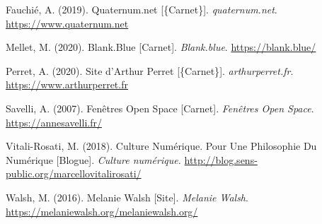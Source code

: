 \documentclass[12pt,french,letterpaper]{article}
\begin{document}
{\begin{CSLReferences}{1}{0}
\leavevmode{}%
Fauchié, A. (2019). {Quaternum.net} {[}\{Carnet\}{]}.
\emph{quaternum.net}. \url{https://www.quaternum.net}

\leavevmode{}%
Mellet, M. (2020). Blank.Blue {[}Carnet{]}. \emph{Blank.blue}.
\url{https://blank.blue/}

\leavevmode{}%
Perret, A. (2020). {Site d'Arthur Perret} {[}\{Carnet\}{]}.
\emph{arthurperret.fr}. \url{https://www.arthurperret.fr}

\leavevmode{}%
Savelli, A. (2007). Fenêtres {Open Space} {[}Carnet{]}. \emph{Fenêtres
Open Space}. \url{https://annesavelli.fr/}

\leavevmode{}%
Vitali-Rosati, M. (2018). Culture Numérique. {Pour} Une Philosophie Du
Numérique {[}Blogue{]}. \emph{Culture numérique.}
\url{http://blog.sens-public.org/marcellovitalirosati/}

\leavevmode{}%
Walsh, M. (2016). Melanie {Walsh} {[}Site{]}. \emph{Melanie Walsh}.
\url{https://melaniewalsh.org/melaniewalsh.org/}

\end{CSLReferences}}
\end{document}
